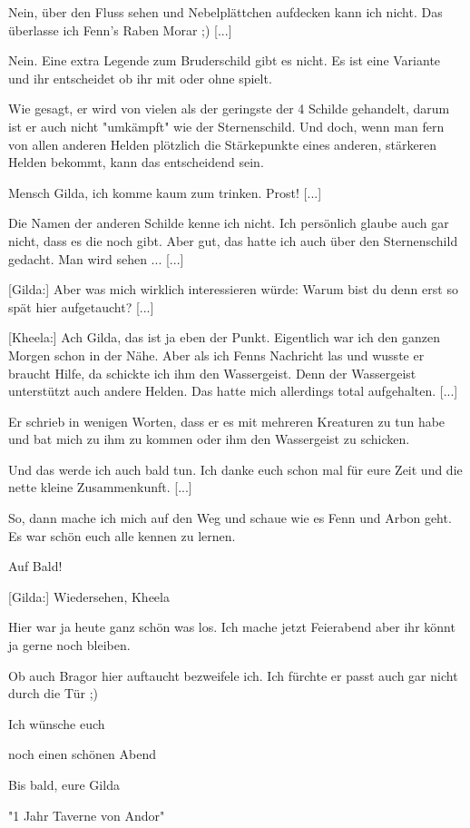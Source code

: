 \documentclass[10pt, a4paper, oneside]{book}
\begin{document}
\begin{multicols}{2}
Nein, über den Fluss sehen und Nebelplättchen aufdecken kann ich nicht. Das überlasse ich Fenn's Raben Morar ;) [...]

Nein. Eine extra Legende zum Bruderschild gibt es nicht. Es ist eine Variante und ihr entscheidet ob ihr mit oder ohne spielt.

Wie gesagt, er wird von vielen als der geringste der 4 Schilde gehandelt, darum ist er auch nicht "umkämpft" wie der Sternenschild. Und doch, wenn man fern von allen anderen Helden plötzlich die Stärkepunkte eines anderen, stärkeren Helden bekommt, kann das entscheidend sein.

Mensch Gilda, ich komme kaum zum trinken. Prost! [...]

Die Namen der anderen Schilde kenne ich nicht. Ich persönlich glaube auch gar nicht, dass es die noch gibt. Aber gut, das hatte ich auch über den Sternenschild gedacht. Man wird sehen ... [...]

[Gilda:] Aber was mich wirklich interessieren würde: Warum bist du denn erst so spät hier aufgetaucht? [...]

[Kheela:] Ach Gilda, das ist ja eben der Punkt. Eigentlich war ich den ganzen Morgen schon in der Nähe. Aber als ich Fenns Nachricht las und wusste er braucht Hilfe, da schickte ich ihm den Wassergeist. Denn der Wassergeist unterstützt auch andere Helden. Das hatte mich allerdings total aufgehalten. [...]

Er schrieb in wenigen Worten, dass er es mit mehreren Kreaturen zu tun habe und bat mich zu ihm zu kommen oder ihm den Wassergeist zu schicken.

Und das werde ich auch bald tun. Ich danke euch schon mal für eure Zeit und die nette kleine Zusammenkunft. [...]

So, dann mache ich mich auf den Weg und schaue wie es Fenn und Arbon geht.
Es war schön euch alle kennen zu lernen.

Auf Bald!

[Gilda:] Wiedersehen, Kheela

Hier war ja heute ganz schön was los. Ich mache jetzt Feierabend aber ihr könnt ja gerne noch bleiben.

Ob auch Bragor hier auftaucht bezweifele ich. Ich fürchte er passt auch gar nicht durch die Tür ;)

Ich wünsche euch

noch einen schönen Abend

Bis bald, eure Gilda

\begin{center}
    "1 Jahr Taverne von Andor"
\end{center}


\end{multicols}
\end{document}
